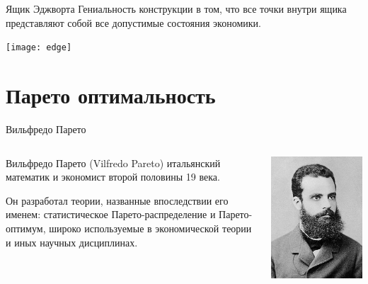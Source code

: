 \documentclass{beamer}
\begin{document}
\begin{frame}{Ящик Эджворта}
Гениальность конструкции в том, что все точки внутри ящика представляют собой все допустимые состояния экономики.
    \begin{center}
     \texttt{[image: edge]}
     \end{center}
\end{frame}

\section{Парето оптимальность}

\begin{frame}{Вильфредо Парето}
\begin{columns}
\begin{column}{0.5\textwidth}
   \alert{Вильфредо Парето} (Vilfredo Pareto) итальянский математик и экономист второй половины 19 века. 
   
  Он разработал теории, названные впоследствии его именем: статистическое Парето-распределение и Парето-оптимум, широко используемые в экономической теории и иных научных дисциплинах.
\end{column}
\begin{column}{0.5\textwidth}  %
    \begin{center}
     \includegraphics[width=1\textwidth]{Pareto}
     \end{center}
\end{column}
\end{columns}
\end{frame}
\end{document}
